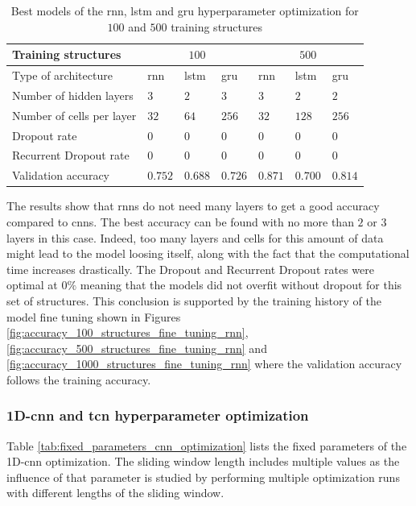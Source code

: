 \documentclass[conference]{IEEEtran}
\begin{document}
\begin{table}[htp]
	\centering
	\caption{Best models of the \gls{rnn}, \gls{lstm} and \gls{gru} hyperparameter optimization for $ 100 $ and $ 500 $ training structures}
	\label{tab:results_parameters_rnn_optimization}
	\setlength{\tabcolsep}{3pt} %
	\begin{tabular}{p{2.5cm}|lll|lll}
		Training structures & \multicolumn{3}{c}{$ 100 $} & \multicolumn{3}{c}{$ 500 $} \\
		\hline
		Type of architecture & \gls{rnn} & \gls{lstm} & \gls{gru} & \gls{rnn} & \gls{lstm} & \gls{gru}\\
		\hline
		Number of hidden layers & $3$ & $2$ & $3$ & $3$ & $2$ & $2$ \\
		Number of cells per layer & $32$ & $64$ & $256$ & $32$ & $128$ & $256$ \\
		Dropout rate & $0$ & $0$ & $0$ & $0$ & $0$ & $0$ \\
		Recurrent Dropout rate & $0$ & $0$ & $0$& $0$ & $0$ & $0$ \\
		\hline
		Validation accuracy & $0.752$ & $0.688$ & $0.726$ & $0.871$ & $0.700$ & $0.814$
	\end{tabular}
\end{table}

The results show that \glspl{rnn} do not need many layers to get a good accuracy compared to \glspl{cnn}. The best accuracy can be found with no more than $ 2 $ or $ 3 $ layers in this case. Indeed, too many layers and cells for this amount of data might lead to the model loosing itself, along with the fact that the computational time increases drastically. The Dropout and Recurrent Dropout rates were optimal at $ 0 \% $ meaning that the models did not overfit without dropout for this set of structures. This conclusion is supported by the training history of the model fine tuning shown in Figures \ref{fig:accuracy_100_structures_fine_tuning_rnn}, \ref{fig:accuracy_500_structures_fine_tuning_rnn} and \ref{fig:accuracy_1000_structures_fine_tuning_rnn} where the validation accuracy follows the training accuracy.

\subsubsection{1D-\gls{cnn} and \gls{tcn} hyperparameter optimization}
\label{sec:cnn_hyperparameter_optimization}

Table \ref{tab:fixed_parameters_cnn_optimization} lists the fixed parameters of the 1D-\gls{cnn} optimization. The sliding window length includes multiple values as the influence of that parameter is studied by performing multiple optimization runs with different lengths of the sliding window.
\end{document}
